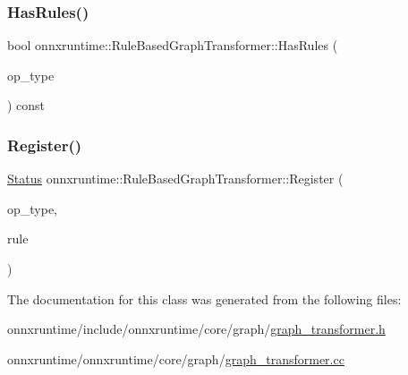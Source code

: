 \subsubsection{\texorpdfstring{Has\+Rules()}{HasRules()}}
{\footnotesize\ttfamily bool onnxruntime\+::\+Rule\+Based\+Graph\+Transformer\+::\+Has\+Rules (\begin{DoxyParamCaption}\item[{const std\+::string \&}]{op\+\_\+type }\end{DoxyParamCaption}) const\hspace{0.3cm}{\ttfamily [inline]}}

\mbox{\label{classonnxruntime_1_1RuleBasedGraphTransformer_a829ec095108f9fc3fd5863eeee1e4f5a}} 
\subsubsection{\texorpdfstring{Register()}{Register()}}
{\footnotesize\ttfamily \mbox{\hyperlink{classonnxruntime_1_1common_1_1Status}{Status}} onnxruntime\+::\+Rule\+Based\+Graph\+Transformer\+::\+Register (\begin{DoxyParamCaption}\item[{const std\+::string \&}]{op\+\_\+type,  }\item[{std\+::unique\+\_\+ptr$<$ \mbox{\hyperlink{classonnxruntime_1_1RewriteRule}{Rewrite\+Rule}} $>$}]{rule }\end{DoxyParamCaption})}



The documentation for this class was generated from the following files\+:\begin{DoxyCompactItemize}
\item 
onnxruntime/include/onnxruntime/core/graph/\mbox{\hyperlink{graph__transformer_8h}{graph\+\_\+transformer.\+h}}\item 
onnxruntime/onnxruntime/core/graph/\mbox{\hyperlink{graph__transformer_8cc}{graph\+\_\+transformer.\+cc}}\end{DoxyCompactItemize}
